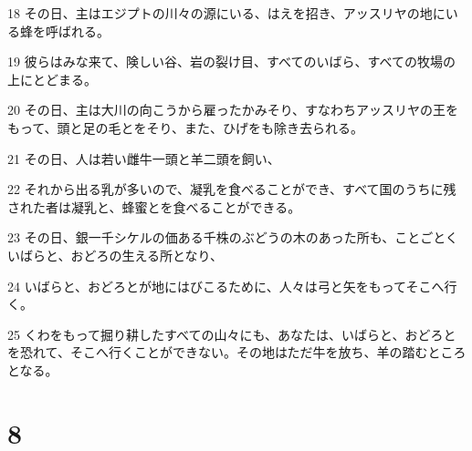 \par 18 その日、主はエジプトの川々の源にいる、はえを招き、アッスリヤの地にいる蜂を呼ばれる。
\par 19 彼らはみな来て、険しい谷、岩の裂け目、すべてのいばら、すべての牧場の上にとどまる。
\par 20 その日、主は大川の向こうから雇ったかみそり、すなわちアッスリヤの王をもって、頭と足の毛とをそり、また、ひげをも除き去られる。
\par 21 その日、人は若い雌牛一頭と羊二頭を飼い、
\par 22 それから出る乳が多いので、凝乳を食べることができ、すべて国のうちに残された者は凝乳と、蜂蜜とを食べることができる。
\par 23 その日、銀一千シケルの価ある千株のぶどうの木のあった所も、ことごとくいばらと、おどろの生える所となり、
\par 24 いばらと、おどろとが地にはびこるために、人々は弓と矢をもってそこへ行く。
\par 25 くわをもって掘り耕したすべての山々にも、あなたは、いばらと、おどろとを恐れて、そこへ行くことができない。その地はただ牛を放ち、羊の踏むところとなる。

\chapter{8}


